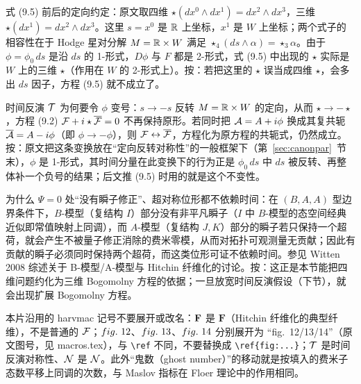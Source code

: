 \begin{yizhu}[易错点]
式 (9.5) 前后的定向约定：原文取四维 $\star(dx^0\wedge dx^1)=dx^2\wedge dx^3$，三维 $\star(dx^1)=dx^2\wedge dx^3$。这里 $s=x^0$ 是 $\Bbb{R}$ 上坐标，$x^1$ 是 $W$ 上坐标；两个式子的相容性在于 Hodge 星对分解 $M=\Bbb{R}\times W$ 满足 $\star_4(ds\wedge\alpha)=\star_3\alpha$。由于 $\phi=\phi_0\,ds$ 是沿 $ds$ 的 1-形式，$D\phi$ 与 $F$ 都是 2-形式，式 (9.5) 中出现的 $\star$ 实际是 $W$ 上的三维 $\star$（作用在 $W$ 的 2-形式上）。按：若把这里的 $\star$ 误当成四维 $\star$，会多出 $ds$ 因子，方程 (9.5) 就不成立了。
\end{yizhu}

\begin{yizhu}[易错点]
时间反演 ${\EUT}$ 为何要令 $\phi$ 变号：$s\to -s$ 反转 $M=\Bbb{R}\times W$ 的定向，从而 $\star\to -\star$，方程 (9.2) ${\cal F}+i\star\bar\CF=0$ 不再保持原形。若同时把 $\CA=A+i\phi$ 换成其复共轭 $\bar\CA=A-i\phi$（即 $\phi\to-\phi$），则 ${\cal F}\leftrightarrow\bar\CF$，方程化为原方程的共轭式，仍然成立。按：原文把这条变换放在“定向反转对称性”的一般框架下（第~\ref{sec:canonpar}~节末），$\phi$ 是 1-形式，其时间分量在此变换下的行为正是 $\phi_0\,ds$ 中 $ds$ 被反转、再整体补一个负号的结果；后文推 (9.5) 时用的就是这个不变性。
\end{yizhu}

\begin{yizhu}[物理图像]
为什么 $\Psi=0$ 处“没有瞬子修正”、超对称位形都不依赖时间：在 $(B,A,A)$ 型边界条件下，$B$-模型（复结构 $I$）部分没有非平凡瞬子（$I$ 中 $B$-模型的态空间经典近似即常值映射上同调），而 $A$-模型（复结构 $J,K$）部分的瞬子若只保持一个超荷，就会产生不被量子修正消除的费米零模，从而对拓扑可观测量无贡献；因此有贡献的瞬子必须同时保持两个超荷，而这类位形可证不依赖时间。参见 Witten 2008 综述关于 B-模型/A-模型与 Hitchin 纤维化的讨论。按：这正是本节能把四维问题约化为三维 Bogomolny 方程的依据；一旦放宽时间反演假设（下节），就会出现扩展 Bogomolny 方程。
\end{yizhu}

\begin{yizhu}[易错点]
本片沿用的 harvmac 记号不要展开或改名：${\CMF}$ 是 $\mathbf{F}$（Hitchin 纤维化的典型纤维），不是普通的 $\cal F$；$\botampo$、$\otampo$、$\notampo$ 分别展开为 “fig.~12/13/14”（原文图号，见 macros.tex），与 \verb|\ref| 不同，不要替换成 \verb|\ref{fig:...}|；${\EUT}$ 是时间反演对称性、${\EUN}$ 是 $\cal N$。此外“鬼数（ghost number）”的移动就是按填入的费米子态数平移上同调的次数，与 Maslov 指标在 Floer 理论中的作用相同。
\end{yizhu}
